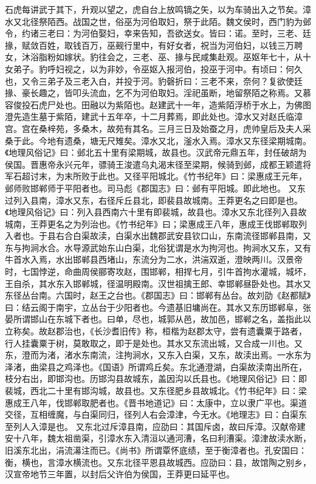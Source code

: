 \documentclass[12pt,UTF8]{ctexbook}
\begin{document}
石虎每讲武于其下，升观以望之，虎自台上放鸣镝之矢，以为车骑出入之节矣。漳水又北径祭陌西。战国之世，俗巫为河伯取妇，祭于此陌。魏文侯时，西门豹为邺令，约诸三老曰：为河伯娶妇，幸来告知，吾欲送女。皆曰：诺。至时，三老、廷掾，赋敛百姓，取钱百万，巫觋行里中，有好女者，祝当为河伯妇，以钱三万聘女，沐浴脂粉如嫁状。豹往会之，三老、巫、掾与民咸集赴观。巫妪年七十，从十女弟子。豹呼妇视之，以为非妙，令巫妪入报河伯，投巫于河中。有顷曰：何久也，又令三弟子及三老入白，并投于河。豹磬折曰：三老不来，奈何？复欲使廷掾、豪长趣之，皆叩头流血，乞不为河伯取妇。淫祀虽断，地留祭陌之称焉。又慕容俊投石虎尸处也。田融以为紫陌也。赵建武十一年，造紫陌浮桥于水上，为佛图澄先造生墓于紫陌，建武十五年卒，十二月葬焉，即此处也。漳水又对赵氏临漳宫。宫在桑梓苑，多桑木，故苑有其名。三月三日及始蚕之月，虎帅皇后及夫人采桑于此。今地有遗桑，塘无尺雉矣。漳水又北，滏水入焉。漳水又东径梁期城南。《地理风俗记》曰：邺北五十里有梁期城，故县也。汉武帝元鼎五年，封任破胡为侯国。晋惠帝永兴元年，骠骑王浚遣乌丸渴末径至梁期，候骑到邺，成都王颖遣将军石超讨末，为末所败于此也。又径平阳城北。《竹书纪年》曰：梁惠成王元年，邺师败邯郸师于平阳者也。司马彪《郡国志》曰：邺有平阳城。即此地也。
又东过列入县南，漳水又东，右径斥丘县北，即裴县故城南。王莽更名之曰即是也。《地理风俗记》曰：列入县西南六十里有即裴城，故县也。漳水又东北径列入县故城南，王莽更名之为列治也。《竹书纪年》曰；梁惠成王八年，惠成王伐邯郸取列入者也。于县右合白渠故渎，白渠水出魏郡武安县钦口山，东南流径邯郸县南，又东与拘涧水合。水导源武始东山白渠，北俗犹谓是水为拘河也。拘涧水又东，又有牛首水入焉，水出邯郸县西堵山，东流分为二水，洪湍双逝，澄映两川。汉景帝时，七国悖逆，命曲周侯郦寄攻赵，围邯郸，相捍七月，引牛首拘水灌城，城坏，王自杀，其水东入邯郸城，径温明殿南。汉世祖擒王郎、幸邯郸昼卧处也。其水又东径丛台南。六国时，赵王之台也。《郡国志》曰：邯郸有丛台。故刘劭《赵都赋》曰：结云阁于南宇，立丛台于少阳者也。今遗基旧墉尚在。其水又东历邯郸阜，张晏所谓邯山在东城下者也。曰单，尽也，城郭从邑，故加邑，邯郸之名，盖指此以立称矣。故赵郡治也，《长沙耆旧传》称，桓楷为赵郡太守，尝有遗囊粟于路者，行人挂囊粟于树，莫敢取之，即于是处也。其水又东流出城，又合成一川也。又东，澄而为渚，渚水东南流，注拘涧水，又东入白渠，又东，故渎出焉。一水东为泽渚，曲梁县之鸡泽也。《国语》所谓鸡丘矣。东北通澄湖，白渠故渎南出所在，枝分右出，即邯沟也。历邯沟县故城东，盖因沟以氏县也。《地理风俗记》曰：即裴城，西北二十里有邯沟城，故县也。又东径肥乡县故城北。《竹书纪年》曰：梁惠成王八年，伐邯郸取肥者也。《晋书地道记》曰：太康中，立以隶广平也。渠道交径，互相缠魔，与白渠同归，径列人右会漳津，今无水。《地理志》曰：白渠东至列人入漳是也。
又东北过斥漳县南，应劭曰：其国斥卤，故曰斥漳。汉献帝建安十八年，魏太祖凿渠，引漳水东入清洹以通河漕，名曰利漕渠。漳津故渎水断，旧溪东北出，涓流濗注而已。《尚书》所谓覃怀底绩，至于衡漳者也。孔安国曰：衡，横也，言漳水横流也。又东北径平恩县故城西。应劭曰：县，故馆陶之别乡，汉宣帝地节三年置，以封后父许伯为侯国，王莽更曰延平也。
\end{document}

